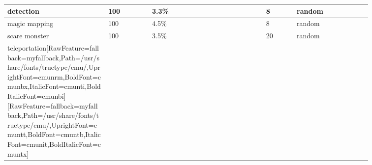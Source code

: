 \begin{longtable}{|>{\RaggedRight}p{0.23497\linewidth}|>{\RaggedRight}p{0.10823\linewidth}|>{\RaggedRight}p{0.26606\linewidth}|>{\RaggedRight}p{0.07394\linewidth}|>{\RaggedRight}p{0.17393\linewidth}|}
detection\footnotemark[40]&\hspace*{0pt}\ignorespaces{}\hspace*{0pt}100&\hspace*{0pt}\ignorespaces{}\hspace*{0pt}3.3\%&\hspace*{0pt}\ignorespaces{}\hspace*{0pt}8&\hspace*{0pt}\ignorespaces{}\hspace*{0pt}random\footnotemark[41]\\ \hline \hspace*{0pt}\ignorespaces{}\hspace*{0pt}magic mapping\footnotemark[42]&\hspace*{0pt}\ignorespaces{}\hspace*{0pt}100&\hspace*{0pt}\ignorespaces{}\hspace*{0pt}4.5\%&\hspace*{0pt}\ignorespaces{}\hspace*{0pt}8&\hspace*{0pt}\ignorespaces{}\hspace*{0pt}random\footnotemark[43]\\ \hline \hspace*{0pt}\ignorespaces{}\hspace*{0pt}scare monster\footnotemark[44]&\hspace*{0pt}\ignorespaces{}\hspace*{0pt}100&\hspace*{0pt}\ignorespaces{}\hspace*{0pt}3.5\%&\hspace*{0pt}\ignorespaces{}\hspace*{0pt}20&\hspace*{0pt}\ignorespaces{}\hspace*{0pt}random\footnotemark[45]\\ \hline \hspace*{0pt}\ignorespaces{}\hspace*{0pt}teleportation\footnotemark[46]\allowbreak{}\setmainfont{cmunrm.ttf}[RawFeature={fallback=myfallback},Path=/usr/share/fonts/truetype/cmu/,UprightFont=cmunrm,BoldFont=cmunbx,ItalicFont=cmunti,BoldItalicFont=cmunbi]\setmonofont{cmunrm.ttf}[RawFeature={fallback=myfallback},Path=/usr/share/fonts/truetype/cmu/,UprightFont=cmuntt,BoldFont=cmuntb,ItalicFont=cmunit,BoldItalicFont=cmuntx]\textsuperscript{1, 
\end{longtable}
